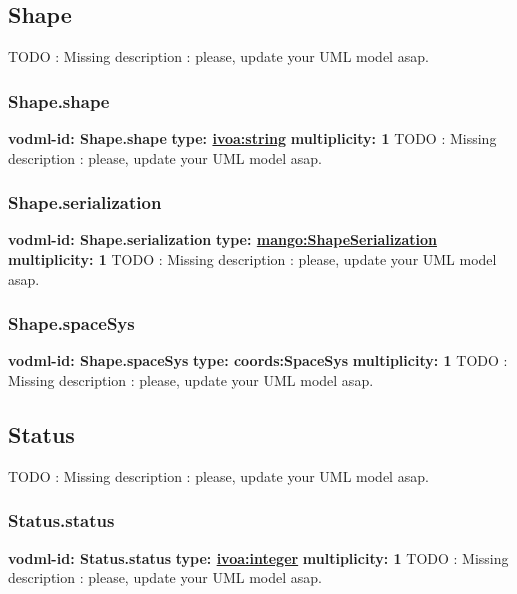   \subsection{Shape}
  \label{sect:Shape}
    TODO : Missing description : please, update your UML model asap.

    \subsubsection{Shape.shape}
      \textbf{vodml-id: Shape.shape} \newline
      \textbf{type: \hyperref[sect:ivoa]{ivoa:string}} \newline
      \textbf{multiplicity: 1} \newline
      TODO : Missing description : please, update your UML model asap.

    \subsubsection{Shape.serialization}
      \textbf{vodml-id: Shape.serialization} \newline
      \textbf{type: \hyperref[sect:ShapeSerialization]{mango:ShapeSerialization}} \newline
      \textbf{multiplicity: 1} \newline
      TODO : Missing description : please, update your UML model asap.

    \subsubsection{Shape.spaceSys}
      \textbf{vodml-id: Shape.spaceSys} \newline
      \textbf{type: coords:SpaceSys} \newline
      \textbf{multiplicity: 1} \newline
      TODO : Missing description : please, update your UML model asap.

  \subsection{Status}
  \label{sect:Status}
    TODO : Missing description : please, update your UML model asap.

    \subsubsection{Status.status}
      \textbf{vodml-id: Status.status} \newline
      \textbf{type: \hyperref[sect:ivoa]{ivoa:integer}} \newline
      \textbf{multiplicity: 1} \newline
      TODO : Missing description : please, update your UML model asap.

